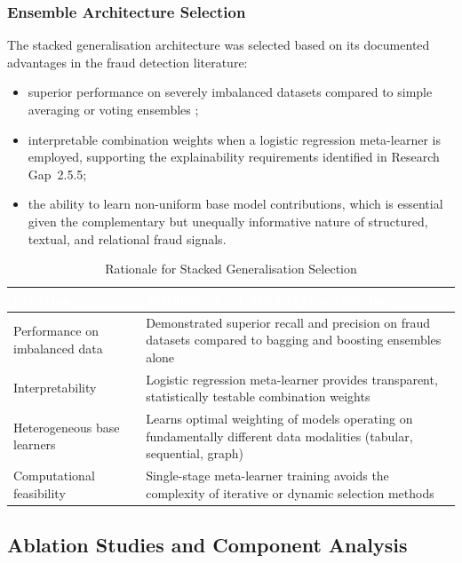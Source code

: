 \documentclass[12pt,a4paper,oneside]{report}
\numberwithin{equation}{chapter}
\renewcommand{\arraystretch}{1.6}
\begin{document}
\subsubsection{Ensemble Architecture Selection}
\label{sec:architecture-selection}

The stacked generalisation architecture was selected based on its documented advantages in the
fraud detection literature:
 \begin{itemize}
     \item superior performance on severely imbalanced datasets compared to simple averaging or voting ensembles \cite{Eteng2025,BDCC2022};
     \item interpretable combination weights when a logistic regression meta-learner is employed, supporting the explainability requirements identified in Research Gap~2.5.5; 
     \item the ability to learn non-uniform base model contributions, which is essential given the complementary but unequally informative nature of structured, textual, and relational fraud signals.
\end{itemize}

\begin{table}[H]
\centering
\caption{Rationale for Stacked Generalisation Selection}
\label{tab:fusion-rationale}
\renewcommand{\arraystretch}{1.4}
\begin{tabular}{L{4cm} L{9cm}}
\toprule
{}
\textcolor{white}{\textbf{Criterion}} &
\textcolor{white}{\textbf{Justification for Stacked Generalisation}} \\
\midrule
{}
Performance on imbalanced data & \cite{Eteng2025,BDCC2022}
Demonstrated superior recall and precision on fraud datasets compared to bagging and boosting ensembles alone  \\
Interpretability &
Logistic regression meta-learner provides transparent, statistically testable combination weights \\
Heterogeneous base learners &
Learns optimal weighting of models operating on fundamentally different data modalities (tabular, sequential, graph) \\
Computational feasibility &
Single-stage meta-learner training avoids the complexity of iterative or dynamic selection methods \\
\bottomrule
\end{tabular}
\end{table}

\subsection{Ablation Studies and Component Analysis}
\label{subsec:ablation-studies}
\end{document}
